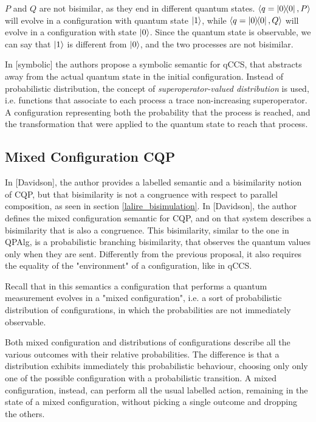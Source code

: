 $P$ and $Q$ are not bisimilar, as they end in different quantum states. $\langle q = \ket{0}\!\!\bra{0}, P\rangle$ will evolve in a configuration with quantum state $\ket{1}$, while $\langle q = \ket{0}\!\!\bra{0}, Q\rangle$ will evolve in a configuration with state $\ket{0}$. Since the quantum state is observable, we can say that $\ket{1}$ is different from $\ket{0}$, and the two processes are not bisimilar.





In [symbolic] the authors propose a symbolic semantic for qCCS, that abstracts away from the actual quantum state in the initial configuration. Instead of probabilistic distribution, the concept of \textit{superoperator-valued distribution} is used, i.e. functions that associate to each process a trace non-increasing superoperator. A configuration  representing both the probability that the process is reached, and the transformation that were applied to the quantum state to reach that process.

\subsection{Mixed Configuration CQP}


In [Davidson], the author provides a labelled semantic and a bisimilarity notion of CQP, but that bisimilarity is not a congruence with respect to parallel composition, as seen in section \ref{lalire_bisimulation}. In [Davidson], the author defines the mixed configuration semantic for CQP, and on that system describes a bisimilarity that is also a congruence. This bisimilarity, similar to the one in QPAlg, is a probabilistic branching bisimilarity, that observes the quantum values only when they are sent. Differently from the previous proposal, it also requires the equality of the "environment" of a configuration, like in qCCS.


Recall that in this semantics a configuration that performs a quantum  measurement evolves in a "mixed configuration", i.e. a sort of probabilistic distribution of configurations, in which the probabilities are not immediately observable.  


Both mixed configuration and distributions of configurations describe all the various outcomes with their relative probabilities. The difference is that a distribution exhibits immediately this probabilistic behaviour, choosing only  only one of the possible configuration with a probabilistic transition. A mixed configuration, instead, can perform all the usual labelled action, remaining in the state of a mixed configuration, without picking a single outcome and dropping the others.


